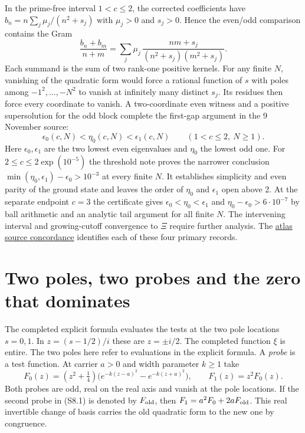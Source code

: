 \documentclass[
  10pt,
  a4paper,
  10pt,
  oneside,
  openany]{book}
\begin{document}
In the prime-free interval \(1<c\le2\), the corrected coefficients have
\(b_n=n\sum_j\mu_j/(n^2+s_j)\) with \(\mu_j>0\) and \(s_j>0\). Hence the
even/odd comparison contains the Gram \[
 \frac{b_n+b_m}{n+m}
   =\sum_j\mu_j\,\frac{nm+s_j}{(n^2+s_j)(m^2+s_j)} .
 \tag{A12}\label{eq:A12}
\] Each summand is the sum of two rank-one positive kernels. For any
finite \(N\), vanishing of the quadratic form would force a rational
function of \(s\) with poles among \(-1^2,\ldots,-N^2\) to vanish at
infinitely many distinct \(s_j\). Its residues then force every
coordinate to vanish. A two-coordinate even witness and a positive
supersolution for the odd block complete the first-gap argument in the 9
November source: \[
 \epsilon_0(c,N)<\eta_0(c,N)<\epsilon_1(c,N)
 \qquad (1<c\le2,\ N\ge1).
\] Here \(\epsilon_0,\epsilon_1\) are the two lowest even eigenvalues
and \(\eta_0\) the lowest odd one. For \(2\le c\le2\exp(10^{-5})\) the
threshold note proves the narrower conclusion
\(\min(\eta_0,\epsilon_1)-\epsilon_0>10^{-3}\) at every finite \(N\). It
establishes simplicity and even parity of the ground state and leaves
the order of \(\eta_0\) and \(\epsilon_1\) open above 2. At the separate
endpoint \(c=3\) the certificate gives \(\epsilon_0<\eta_0<\epsilon_1\)
and \(\eta_0-\epsilon_0>6\cdot10^{-7}\) by ball arithmetic and an
analytic tail argument for all finite \(N\). The intervening interval
and growing-cutoff convergence to \(\Xi\) require further analysis. The
\hyperref[atlas-sources]{atlas source concordance} identifies each of
these four primary records.

\section{Two poles, two probes and the zero that
dominates}\label{atlas-gaussian}

The completed explicit formula evaluates the tests at the two pole
locations \(s=0,1\). In \(z=(s-1/2)/i\) these are \(z=\pm i/2\). The
completed function \(\xi\) is entire. The two poles here refer to
evaluations in the explicit formula. A \emph{probe} is a test function.
At carrier \(a>0\) and width parameter \(k\ge1\) take \[
 F_0(z)=(z^2+\tfrac14)\big(e^{-k(z-a)^2}-e^{-k(z+a)^2}\big),
 \qquad F_1(z)=z^2F_0(z).
 \tag{A13}\label{eq:A13}
\] Both probes are odd, real on the real axis and vanish at the pole
locations. If the second probe in (S8.1) is denoted by \(F_{\rm old}\),
then \(F_1=a^2F_0+2aF_{\rm old}\). This real invertible change of basis
carries the old quadratic form to the new one by congruence.
\end{document}
